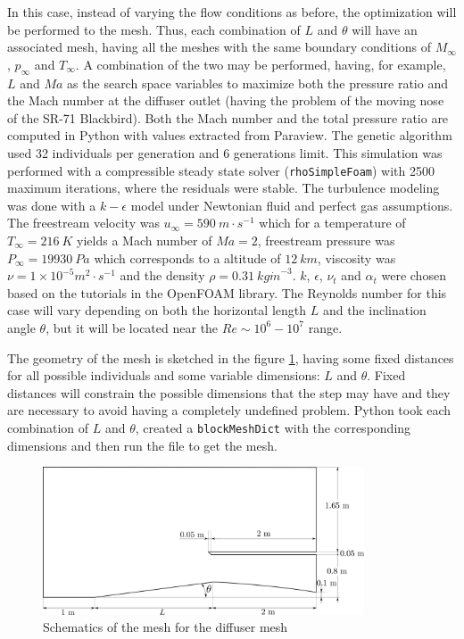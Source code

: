 In this case, instead of varying the flow conditions as before, the optimization will be performed to the mesh. Thus, each combination of $L$ and $\theta$ will have an associated mesh, having all the meshes with the same boundary conditions of $M_\infty$, $p_\infty$ and $T_\infty$. A combination of the two may be performed, having, for example, $L$ and $Ma$ as the search space variables to maximize both the pressure ratio and the Mach number at the diffuser outlet (having the problem of the moving nose of the SR-71 Blackbird).  Both the Mach number and the total pressure ratio are computed in Python with values extracted from Paraview. The genetic algorithm used 32 individuals per generation and 6 generations limit. This simulation was performed with a compressible steady state solver (\texttt{rhoSimpleFoam}) with 2500 maximum iterations, where the residuals were stable. The turbulence modeling was done with a $k-\epsilon$ model under Newtonian fluid and perfect gas assumptions. The freestream velocity was $u_\infty = 590\ m\cdot s^{-1}$ which for a temperature of $T_\infty=216\ K$ yields a Mach number of $Ma=2$, freestream pressure was $P_\infty=19930\ Pa$ which corresponds to a altitude of $12\ km$, viscosity was $\nu=1\times 10^{-5} m^2 \cdot s^{-1}$ and the density $\rho=0.31\ kg \dot m^{-3}$. $k$, $\epsilon$, $\nu_t$ and $\alpha_t$ were chosen based on the tutorials in the OpenFOAM library. The Reynolds number for this case will vary depending on both the horizontal length $L$ and the inclination angle $\theta$, but it will be located near the $Re \sim 10^6-10^7$ range.

\newpage

The geometry of the mesh is sketched in the figure \ref{fig:diffuserMesh}, having some fixed distances for all possible individuals and some variable dimensions: $L$ and $\theta$. Fixed distances will constrain the possible dimensions that the step may have and they are necessary to avoid having a completely undefined problem. Python took each combination of $L$ and $\theta$, created a \texttt{blockMeshDict} with the corresponding dimensions and then run the file to get the mesh. 

     \begin{figure}[h!]
        \centering
        \includegraphics[width=0.85\textwidth]{Figures/3/diffuserMesh.png}
        \caption{Schematics of the mesh for the diffuser mesh}
        \label{fig:diffuserMesh}
    \end{figure}

